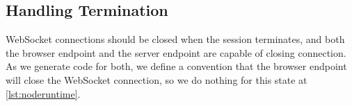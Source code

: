 \subsection{Handling Termination}
WebSocket connections should be closed when the session terminates,
and both the browser endpoint and the server endpoint are capable
of closing connection. As we generate code for both, we define
a convention that the browser endpoint will close 
the WebSocket connection,
so we do nothing for this state at \cref{lst:noderuntime}.